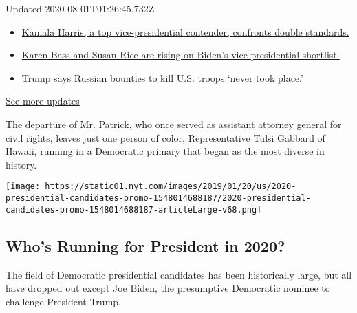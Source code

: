Updated 2020-08-01T01:26:45.732Z

\begin{itemize}
\tightlist
\item
  \href{https://www.nytimes.com/2020/07/31/us/elections/biden-vs-trump.html?action=click\&pgtype=Article\&state=default\&region=MAIN_CONTENT_1\&context=storylines_live_updates\#link-29fdff45}{Kamala
  Harris, a top vice-presidential contender, confronts double
  standards.}
\item
  \href{https://www.nytimes.com/2020/07/31/us/elections/biden-vs-trump.html?action=click\&pgtype=Article\&state=default\&region=MAIN_CONTENT_1\&context=storylines_live_updates\#link-13ec3d9c}{Karen
  Bass and Susan Rice are rising on Biden's vice-presidential
  shortlist.}
\item
  \href{https://www.nytimes.com/2020/07/31/us/elections/biden-vs-trump.html?action=click\&pgtype=Article\&state=default\&region=MAIN_CONTENT_1\&context=storylines_live_updates\#link-49e9a016}{Trump
  says Russian bounties to kill U.S. troops `never took place.'}
\end{itemize}

\href{https://www.nytimes.com/2020/07/31/us/elections/biden-vs-trump.html?action=click\&pgtype=Article\&state=default\&region=MAIN_CONTENT_1\&context=storylines_live_updates}{See
more updates}

The departure of Mr. Patrick, who once served as assistant attorney
general for civil rights, leaves just one person of color,
Representative Tulsi Gabbard of Hawaii, running in a Democratic primary
that began as the most diverse in history.

\href{https://www.nytimes.com/interactive/2019/us/politics/2020-presidential-candidates.html}{}

\texttt{[image: https://static01.nyt.com/images/2019/01/20/us/2020-presidential-candidates-promo-1548014688187/2020-presidential-candidates-promo-1548014688187-articleLarge-v68.png]}

\hypertarget{whos-running-for-president-in-2020}{%
\subsection{Who's Running for President in
2020?}\label{whos-running-for-president-in-2020}}

The field of Democratic presidential candidates has been historically
large, but all have dropped out except Joe Biden, the presumptive
Democratic nominee to challenge President Trump.


